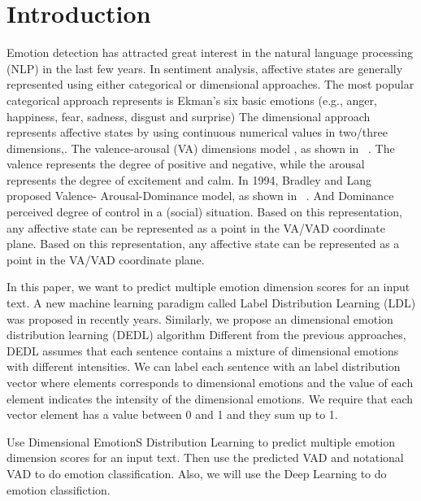 \section{Introduction}\label{sec-intro}


Emotion detection has attracted great interest 
in the natural language processing (NLP)
in the last few years.
In sentiment analysis, 
affective states are generally represented 
using either categorical or dimensional approaches.
The most popular categorical approach represents is 
Ekman’s six basic emotions 
(e.g., anger, happiness, fear, sadness, disgust and surprise)
The dimensional approach represents affective states by using
continuous numerical values in two/three dimensions,.
The valence-arousal (VA) dimensions model , 
as shown in ~. 
The valence represents the degree of 
positive and negative, 
while the arousal represents the degree of 
excitement and calm. 
In 1994,
Bradley and Lang proposed 
Valence- Arousal-Dominance model,
as shown in ~.
And Dominance perceived degree of control in a (social) situation.
Based on this representation, 
any affective state can be represented as a point 
in the VA/VAD coordinate plane. 
Based on this representation, 
any affective state can be represented as 
a point in the VA/VAD coordinate plane.

In this paper, 
we want to predict  
multiple emotion dimension scores for an input text.
A new machine learning paradigm called 
Label Distribution Learning (LDL) 
was proposed in recently years.
Similarly,
we propose an dimensional emotion distribution learning (DEDL) algorithm
Different from the previous approaches, 
DEDL assumes that
each sentence contains a mixture of 
dimensional emotions with different intensities. 
We can label each sentence with 
an label distribution vector 
where elements corresponds to 
dimensional emotions and 
the value of each element indicates the intensity of the dimensional emotions. 
We require that each vector element has a value 
between 0 and 1 and they sum up to 1.

Use Dimensional EmotionS Distribution Learning
to predict multiple emotion dimension scores for an input text.
Then use the predicted VAD and notational VAD to 
do emotion classification.
Also, 
we will use the Deep Learning to do emotion classifiction.

